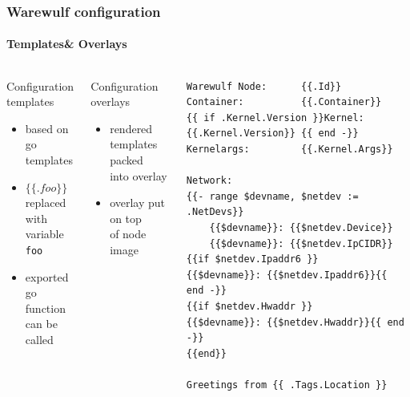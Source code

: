 \documentclass[aspectratio=169]{beamer}
\begin{document}
\begin{frame}[fragile]
\frametitle{Warewulf configuration}
\framesubtitle{Templates\& Overlays}
\begin{columns}
\begin{block}{Configuration templates}
  \begin{itemize}
    \item based on go templates
    \item $\{\{ .foo \}\}$ replaced \\
    with variable \texttt{foo}
    \item exported go function \\
    can be called
  \end{itemize}
\end{block}
\begin{block}{Configuration overlays}
\begin{itemize}
  \item rendered templates packed\\
  into overlay
  \item overlay put on top\\
  of node image
\end{itemize}
\end{block}
\begin{lstlisting}[style=ww,caption=/etc/issue.ww $\rightarrow$ /etc/issue]
Warewulf Node:      {{.Id}}
Container:          {{.Container}}
{{ if .Kernel.Version }}Kernel:             {{.Kernel.Version}} {{ end -}}
Kernelargs:         {{.Kernel.Args}}

Network:
{{- range $devname, $netdev := .NetDevs}}
    {{$devname}}: {{$netdev.Device}}
    {{$devname}}: {{$netdev.IpCIDR}}
{{if $netdev.Ipaddr6 }}    {{$devname}}: {{$netdev.Ipaddr6}}{{ end -}}
{{if $netdev.Hwaddr }}    {{$devname}}: {{$netdev.Hwaddr}}{{ end -}}
{{end}}

Greetings from {{ .Tags.Location }}
\end{lstlisting}
\end{columns}
\end{frame}
\end{document}
